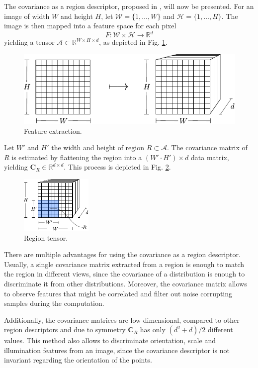 \documentclass[11pt]{article}
\theoremstyle{definition}
\theoremstyle{remark}
\theoremstyle{remark}
\theoremstyle{remark}
\newcommand{\R}{{\mathbb{R}}}
\begin{document}
The covariance as a region descriptor, proposed in \parencite{tuzel2006}, will now be presented. For an image of width $W$ and height $H$, let $\mathcal{W}=\{1,\ldots,W\}$ and $\mathcal{H}=\{1,\ldots,H\}$. The image is then mapped into a feature space for each pixel
\[
    F:\mathcal{W}\times\mathcal{H}\rightarrow\mathbb{R}^{d}
\]
yielding a tensor $\mathcal{A} \subset \R^{W \times H \times d}$, as depicted in Fig. \ref{fig:feat_ext}.
\begin{figure}[H]
    \centering
    \includegraphics[width = 0.6\linewidth]{figs/feature_extraction.pdf}
    \caption{Feature extraction.}
    \label{fig:feat_ext}
\end{figure}
%
Let $W'$ and $H'$ the width and height of region $R\subset\mathcal{A}$. The covariance matrix of $R$ is estimated by flattening the region into a $(W'\cdot H')\times d$ data matrix, yielding $\mathbf{C}_R \in \R^{d \times d}$. This process is depicted in Fig. \ref{fig:region}.
\begin{figure}[H]
    \centering
    \includegraphics[width = 0.3\linewidth]{figs/region1.pdf}
    \caption{Region tensor.}
    \label{fig:region}
\end{figure}

There are multiple advantages for using the covariance as a region descriptor. Usually, a single covariance matrix extracted from a region is enough to match the region in different views, since the covariance of a distribution is enough to discriminate it from other distributions. Moreover, the covariance matrix allows to observe features that might be correlated and filter out noise corrupting samples during the computation.

Additionally, the covariance matrices are low-dimensional, compared to other region descriptors and due to symmetry $\mathbf{C}_{R}$ has only $\left(d^{2}+d\right) / 2$ different values. This method also allows to discriminate orientation, scale and illumination features from an image, since the covariance descriptor is not invariant regarding the orientation of the points.
\end{document}
